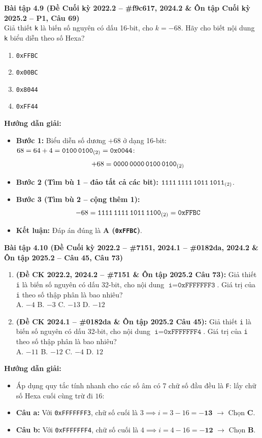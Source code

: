 \textbf{Bài tập 4.9 (Đề Cuối kỳ 2022.2 -- \#f9c617, 2024.2 \& Ôn tập Cuối kỳ 2025.2 -- P1, Câu 69)}\\
Giả thiết \texttt{k} là biến số nguyên có dấu 16-bit, cho $k = -68$. Hãy cho biết nội dung \texttt{k} biểu diễn theo số Hexa?
\begin{enumerate}[label=\Alph*.]
    \item \texttt{0xFFBC}
    \item \texttt{0x00BC}
    \item \texttt{0x8044}
    \item \texttt{0xFF44}
\end{enumerate}
\textbf{Hướng dẫn giải:}
\begin{itemize}
    \item \textbf{Bước 1:} Biểu diễn số dương $+68$ ở dạng 16-bit: $68 = 64 + 4 = \texttt{0100\,0100}_{(2)} = \texttt{0x0044}$:
    $$+68 = \texttt{0000\,0000\,0100\,0100}_{(2)}$$
    \item \textbf{Bước 2 (Tìm bù 1 -- đảo tất cả các bit):} $\texttt{1111\,1111\,1011\,1011}_{(2)}$.
    \item \textbf{Bước 3 (Tìm bù 2 -- cộng thêm 1):}
    $$-68 = \texttt{1111\,1111\,1011\,1100}_{(2)} = \mathbf{\texttt{0xFFBC}}$$
    \item \textbf{Kết luận:} Đáp án đúng là \textbf{A (\texttt{0xFFBC})}.
\end{itemize}

\textbf{Bài tập 4.10 (Đề Cuối kỳ 2022.2 -- \#7151, 2024.1 -- \#0182da, 2024.2 \& Ôn tập 2025.2 -- Câu 45, Câu 73)}
\begin{enumerate}[label=\alph*)]
    \item \textbf{(Đề CK 2022.2, 2024.2 -- \#7151 \& Ôn tập 2025.2 Câu 73):} Giả thiết \texttt{i} là biến số nguyên có dấu 32-bit, cho nội dung $\texttt{i} = \texttt{0xFFFFFFF3}$. Giá trị của \texttt{i} theo số thập phân là bao nhiêu?\\
    A. $-4$ \qquad B. $-3$ \qquad C. $-13$ \qquad D. $-12$
    \item \textbf{(Đề CK 2024.1 -- \#0182da \& Ôn tập 2025.2 Câu 45):} Giả thiết \texttt{i} là biến số nguyên có dấu 32-bit, cho nội dung $\texttt{i} = \texttt{0xFFFFFFF4}$. Giá trị của \texttt{i} theo số thập phân là bao nhiêu?\\
    A. $-11$ \qquad B. $-12$ \qquad C. $-4$ \qquad D. $12$
\end{enumerate}
\textbf{Hướng dẫn giải:}
\begin{itemize}
    \item Áp dụng quy tắc tính nhanh cho các số âm có 7 chữ số đầu đều là \texttt{F}: lấy chữ số Hexa cuối cùng trừ đi $16$:
    \item \textbf{Câu a:} Với \texttt{0xFFFFFFF3}, chữ số cuối là $3 \implies i = 3 - 16 = \mathbf{-13}$ $\rightarrow$ Chọn \textbf{C}.
    \item \textbf{Câu b:} Với \texttt{0xFFFFFFF4}, chữ số cuối là $4 \implies i = 4 - 16 = \mathbf{-12}$ $\rightarrow$ Chọn \textbf{B}.
\end{itemize}

